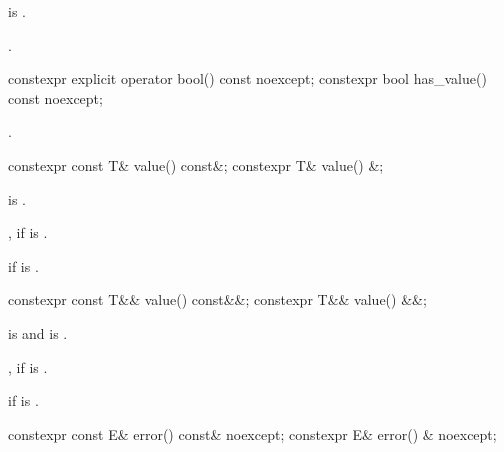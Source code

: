 \begin{itemdescr}
\pnum
\hardexpects
{} is .

\pnum
\returns
{}.
\end{itemdescr}

%
%
\begin{itemdecl}
constexpr explicit operator bool() const noexcept;
constexpr bool has_value() const noexcept;
\end{itemdecl}

\begin{itemdescr}
\pnum
\returns
{}.
\end{itemdescr}

%
\begin{itemdecl}
constexpr const T& value() const&;
constexpr T& value() &;
\end{itemdecl}

\begin{itemdescr}
\pnum
\mandates
{} is .

\pnum
\returns
{}, if  is .

\pnum
\throws
{} if  is .
\end{itemdescr}

%
\begin{itemdecl}
constexpr const T&& value() const&&;
constexpr T&& value() &&;
\end{itemdecl}

\begin{itemdescr}
\pnum
\mandates
{} is  and  is .

\pnum
\returns
{}, if  is .

\pnum
\throws
{} if  is .
\end{itemdescr}

%
\begin{itemdecl}
constexpr const E& error() const& noexcept;
constexpr E& error() & noexcept;
\end{itemdecl}

